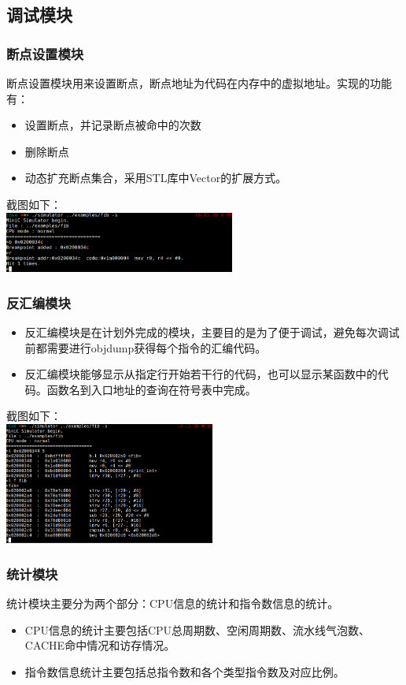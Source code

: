 \documentclass[CJK]{beamer}
\begin{document}
\begin{CJK}{UTF8}{gbsn}
\subsection{调试模块}
\begin{frame}[fragile]
	\frametitle{断点设置模块}
	断点设置模块用来设置断点，断点地址为代码在内存中的虚拟地址。实现的功能有：
	\begin{itemize}
	\item 设置断点，并记录断点被命中的次数
	\item 删除断点
	\item 动态扩充断点集合，采用STL库中Vector的扩展方式。
	\end{itemize}
	截图如下：\\
	\includegraphics[height=2cm]{breakpoint.jpeg}
\end{frame}

\begin{frame}[fragile]
	\frametitle{反汇编模块}
	\begin{itemize}
		\item 反汇编模块是在计划外完成的模块，主要目的是为了便于调试，避免每次调试前都需要进行objdump获得每个指令的汇编代码。
		\item 反汇编模块能够显示从指定行开始若干行的代码，也可以显示某函数中的代码。函数名到入口地址的查询在符号表中完成。
	\end{itemize}
	截图如下：\\
	\includegraphics[height=4cm]{assemble.jpeg}
\end{frame}

\begin{frame}[fragile]
	\frametitle{统计模块}
	统计模块主要分为两个部分：CPU信息的统计和指令数信息的统计。
	\begin{itemize}
		\item CPU信息的统计主要包括CPU总周期数、空闲周期数、流水线气泡数、CACHE命中情况和访存情况。
		\item 指令数信息统计主要包括总指令数和各个类型指令数及对应比例。
	\end{itemize}
\end{frame}


\end{CJK}
\end{document}
